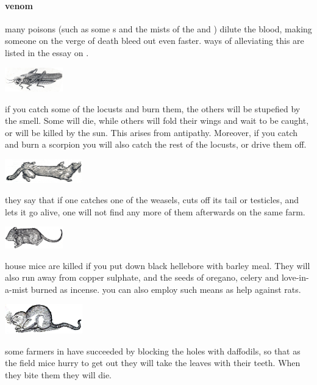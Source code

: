\paragraph{venom} many poisons (such as some s and the mists of the  and ) dilute the blood, making someone on the verge of death bleed out even faster. ways of alleviating this are listed in the essay on .
\begin{center}\includegraphics[width=2.52cm]{encyclopedia/Locust}\end{center} if you catch some of the locusts and burn them, the others will be stupefied by the smell. Some will die, while others will fold their wings and wait to be caught, or will be killed by the sun. This arises from antipathy. Moreover, if you catch and burn a scorpion you will also catch the rest of the locusts, or drive them off. \localpar 
\begin{center}\includegraphics[width=3.36cm]{encyclopedia/Weasel}\end{center} they say that if one catches one of the weasels, cuts off its tail or testicles, and lets it go alive, one will not find any more of them afterwards on the same farm. \localpar
\begin{center}\includegraphics[width=2.52cm]{encyclopedia/HouseMouse}\end{center}  house mice are killed if you put down black hellebore with barley meal. They will also run away from copper sulphate, and the seeds of oregano, celery and love-in-a-mist burned as incense. you can also employ such means as help against rats. \localpar
\begin{center}\includegraphics[width=3.36cm]{encyclopedia/FieldMouse}\end{center} some farmers in  have succeeded by blocking the holes with daffodils, so that as the field mice hurry to get out they will take the leaves with their teeth. When they bite them they will die. \localpar
